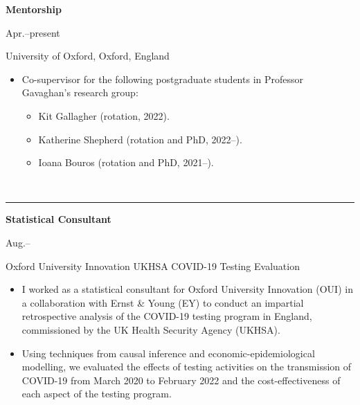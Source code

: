 \documentclass[11pt]{article}
\begin{document}
\noindent\parbox{.75\textwidth}{\raggedright \textbf{Mentorship}}
\parbox{.25\textwidth}{ Apr.--present}
University of Oxford, Oxford, England
\vspace{-.15cm}
\begin{itemize}
\setlength{\itemsep}{4pt}
\setlength{\parskip}{0pt}
\setlength{\parsep}{0pt}
\item Co-supervisor for the following postgraduate students in Professor Gavaghan's research group:
\begin{itemize}
\setlength{\itemsep}{0pt}
\item Kit Gallagher (rotation, 2022).
\item Katherine Shepherd (rotation and PhD, 2022--).
\item Ioana Bouros (rotation and PhD, 2021--).
\end{itemize}
\end{itemize}




\vspace{0.5cm}

\vspace{-2.75mm} \\
\rule{\textwidth}{0.4pt}
\vspace{0.1mm}
\noindent\parbox{.75\textwidth}{\raggedright \textbf{Statistical Consultant}}
\parbox{.25\textwidth}{ Aug.--}
Oxford University Innovation UKHSA COVID-19 Testing Evaluation
\vspace{-.25cm}
\begin{itemize}
\setlength{\itemsep}{4pt}
\setlength{\parskip}{0pt}
\setlength{\parsep}{0pt}
\item I worked as a statistical consultant for Oxford University Innovation (OUI) in a collaboration with Ernst \& Young (EY) to conduct an impartial retrospective analysis of the COVID-19 testing program in England, commissioned by the UK Health Security Agency (UKHSA).
\item Using techniques from causal inference and economic-epidemiological modelling, we evaluated the effects of testing activities on the transmission of COVID-19 from March 2020 to February 2022 and the cost-effectiveness of each aspect of the testing program.
\end{itemize}
\end{document}
